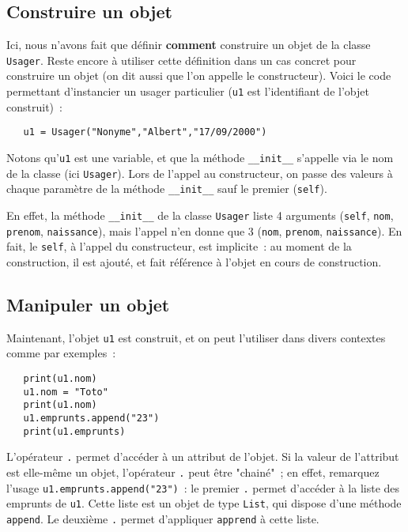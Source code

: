 \documentclass[10pt,a4paper]{sujets-exercices}
\begin{document}
\subsection*{Construire un objet}

Ici, nous n'avons fait que définir \textbf{comment} construire un objet de la classe \texttt{Usager}. Reste encore à utiliser cette définition dans un cas concret pour construire un objet (on dit aussi que l'on appelle le constructeur). Voici le code permettant d'instancier un usager particulier (\verb!u1! est l'identifiant de l'objet construit)~:

\begin{verbatim}
   u1 = Usager("Nonyme","Albert","17/09/2000")
\end{verbatim} 

Notons qu'\texttt{u1} est une variable, et que la méthode \verb!__init__! s'appelle via le nom de la classe (ici \texttt{Usager}). Lors de l'appel au constructeur, on passe des valeurs à chaque paramètre de la méthode \texttt{\_\_init\_\_} sauf le premier (\verb!self!). 

En effet, la méthode \texttt{\_\_init\_\_} de la classe \texttt{Usager} liste 4 arguments (\texttt{self}, \texttt{nom}, \texttt{prenom}, \texttt{naissance}), mais l'appel n'en donne que 3 (\texttt{nom}, \texttt{prenom}, \texttt{naissance}). En fait, le \texttt{self}, à l'appel du constructeur, est implicite~: au moment de la construction, il est ajouté, et fait référence à l'objet en cours de construction.

\subsection*{Manipuler un objet}

Maintenant, l'objet \texttt{u1} est construit, et on peut l'utiliser dans divers contextes comme par exemples~:

\begin{verbatim}
   print(u1.nom)
   u1.nom = "Toto"
   print(u1.nom)
   u1.emprunts.append("23")
   print(u1.emprunts)
\end{verbatim}

L'opérateur \texttt{.} permet d'accéder à un attribut de l'objet. Si la valeur de l'attribut est elle-même un objet, l'opérateur \verb!.! peut être "chainé"~; en effet, remarquez l'usage  \texttt{u1.emprunts.append("23")}~: le premier \texttt{.} permet d'accéder à la liste des emprunts de \texttt{u1}. Cette liste est un objet de type \texttt{List}, qui dispose d'une méthode \texttt{append}. Le deuxième \texttt{.} permet d'appliquer \texttt{apprend} à cette liste. 
\end{document}
